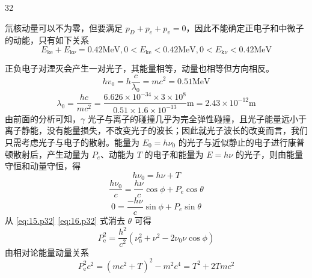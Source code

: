 \begin{solution}{32}
\begin{subsolution}
\begin{equation}
      \label{eq:11.p32}
    \end{equation}
    氘核动量可以不为零，但要满足 $p_{D} + p_{e} + p_{v} = 0$，因此不能确定正电子和中微子的动能，只有如下关系
    \begin{equation}
      E_{\mathrm{ke}} + E_{\mathrm{k} \nu} = 0.42 \mathrm{MeV}, 0 < E_{\mathrm{ke}} < 0.42 \mathrm{MeV}, 0 < E_{\mathrm{k} \nu} < 0.42 \mathrm{MeV}
      \label{eq:12.p32}
    \end{equation}
  \end{subsolution}
  \begin{subsolution}
    正负电子对湮灭会产生一对光子，其能量相等，动量也相等但方向相反。
    \begin{equation}
      h v_{0} = h \frac{c}{\lambda_{0}} = m c^{2} = 0.51 \mathrm{MeV}
    \end{equation}
    \begin{equation}
      \lambda_{0} = \frac{h c}{m c^{2}} = \frac{6.626 \times 10^{-34} \times 3 \times 10^{8}}{0.51 \times 1.6 \times 10^{-13}} \mathrm{m} = 2.43 \times 10^{-12} \mathrm{m}
      \label{eq:13.p32}
    \end{equation}
    由前面的分析可知，$\gamma$ 光子与离子的碰撞几乎为完全弹性碰撞，且光子能量远小于离子静能，没有能量损失，不改变光子的波长；因此就光子波长的改变而言，我们只需考虑光子与电子的散射。能量为 $E_0 = h\nu_0$ 的光子与近似静止的电子进行康普顿散射后，产生动量为 $P_{e}$、动能为 $T$ 的电子和能量为 $E = h\nu$ 的光子，则由能量守恒和动量守恒，得
    \begin{equation}
      h \nu_{0} = h \nu + T
      \label{eq:14.p32}
    \end{equation}
    \begin{equation}
      \frac{h \nu_{0}}{c} = \frac{h \nu}{c} \cos \phi + P_{e} \cos \theta
      \label{eq:15.p32}
    \end{equation}
    \begin{equation}
      0 = \frac{- h \nu}{c} \sin \phi + P_{e} \sin \theta
      \label{eq:16.p32}
    \end{equation}
    从 \eqref{eq:15.p32} \eqref{eq:16.p32} 式消去 $\theta$ 可得
    \begin{equation}
      P_{\mathrm{e}}^{2} = \frac{h^{2}}{c^{2}} (\nu_{0}^{2} + \nu^{2} - 2 \nu_{0} \nu \cos \phi)
      \label{eq:17.p32}
    \end{equation}
    由相对论能量动量关系
    \begin{equation}
      P_{\mathrm{e}}^{2} c^{2} = (m c^{2} + T)^{2} - m^{2} c^{4} = T^{2} + 2 T m c^{2}
    \end{equation}

\end{subsolution}
\end{solution}
